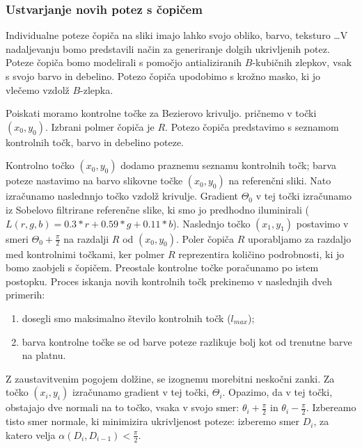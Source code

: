 \subsubsection{Ustvarjanje novih potez s čopičem}
Individualne poteze čopiča na sliki imajo lahko svojo obliko, barvo, teksturo \ldots V nadaljevanju bomo predstavili način za generiranje dolgih ukrivljenih potez. Poteze čopiča bomo modelirali s pomočjo antializiranih $B$-kubičnih zlepkov, vsak s svojo barvo in debelino. Potezo čopiča upodobimo s krožno masko, ki jo vlečemo vzdolž $B$-zlepka.

Poiskati moramo kontrolne točke za Bezierovo krivuljo. pričnemo v točki $(x_0, y_0)$. Izbrani polmer čopiča je $R$. Potezo čopiča predstavimo s seznamom kontrolnih točk, barvo in debelino poteze.

Kontrolno točko $(x_0, y_0)$ dodamo praznemu seznamu kontrolnih točk; barva poteze nastavimo na barvo slikovne točke $(x_0, y_0)$ na referenčni sliki. Nato izračunamo naslednnjo točko vzdolž krivulje. Gradient $\Theta_0$ v tej točki izračunamo iz Sobelovo filtrirane referenčne slike, ki smo jo predhodno iluminirali ($L(r, g, b) = 0.3*r + 0.59*g + 0.11*b$). Naslednjo točko $(x_1, y_1)$ postavimo v smeri $\Theta_0 + \frac{\pi}{2}$ na razdalji $R$ od $(x_0, y_0)$. Poler čopiča $R$ uporabljamo za razdaljo med kontrolnimi točkami, ker polmer $R$ reprezentira količino podrobnosti, ki jo bomo zaobjeli s čopičem. Preostale kontrolne točke poračunamo po istem postopku. Proces iskanja novih kontrolnih točk prekinemo v naslednjih dveh primerih:
%
\begin{enumerate}
  \item dosegli smo maksimalno število kontrolnih točk ($l_{max}$);
  \item barva kontrolne točke se od barve poteze razlikuje bolj kot od trenutne barve na platnu.
\end{enumerate}
%
Z zaustavitvenim pogojem dolžine, se izognemu morebitni neskočni zanki. Za točko $(x_i, y_i)$ izračunamo gradient v tej točki, $\Theta_i$. Opazimo, da v tej točki, obstajajo dve normali na to točko, vsaka v svojo smer: $\theta_i + \frac{\pi}{2}$ in $\theta_i - \frac{\pi}{2}$. Izbereamo tisto smer normale, ki minimizira ukrivljenost poteze: izberemo smer $D_i$, za katero velja $\alpha(D_i, D_{i-1}) < \frac{\pi}{2}$.

